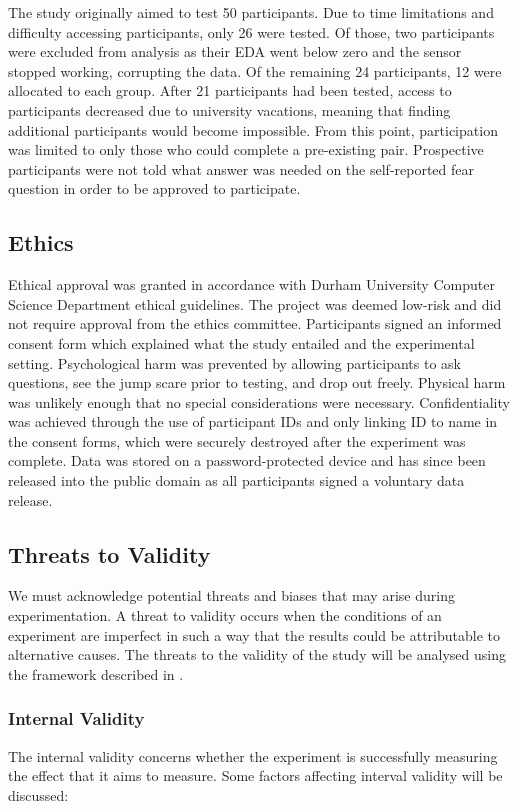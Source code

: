 \documentclass[12pt,a4paper]{article}\usepackage[]{graphicx}\usepackage[]{color}
\begin{document}
The study originally aimed to test 50 participants.
Due to time limitations and difficulty accessing participants, only 26 were tested.
Of those, two participants were excluded from analysis as their EDA went below zero and the sensor stopped working, corrupting the data.
Of the remaining 24 participants, 12 were allocated to each group.
After 21 participants had been tested, access to participants decreased due to university vacations, meaning that finding additional participants would become impossible.
From this point, participation was limited to only those who could complete a pre-existing pair.
Prospective participants were not told what answer was needed on the self-reported fear question in order to be approved to participate.

\subsection{Ethics}
Ethical approval was granted in accordance with Durham University Computer Science Department ethical guidelines.
The project was deemed low-risk and did not require approval from the ethics committee.
Participants signed an informed consent form which explained what the study entailed and the experimental setting.
Psychological harm was prevented by allowing participants to ask questions, see the jump scare prior to testing, and drop out freely.
Physical harm was unlikely enough that no special considerations were necessary.
Confidentiality was achieved through the use of participant IDs and only linking ID to name in the consent forms, which were securely destroyed after the experiment was complete.
Data was stored on a password-protected device and has since been released into the public domain as all participants signed a voluntary data release.

\subsection{Threats to Validity}
\label{sec:Validity}
We must acknowledge potential threats and biases that may arise during experimentation.
A threat to validity occurs when the conditions of an experiment are imperfect in such a way that the results could be attributable to alternative causes.
The threats to the validity of the study will be analysed using the framework described in \citet[pp. 5--6]{validity}.

\subsubsection{Internal Validity}
The internal validity concerns whether the experiment is successfully measuring the effect that it aims to measure. Some factors affecting interval validity will be discussed:
\end{document}

